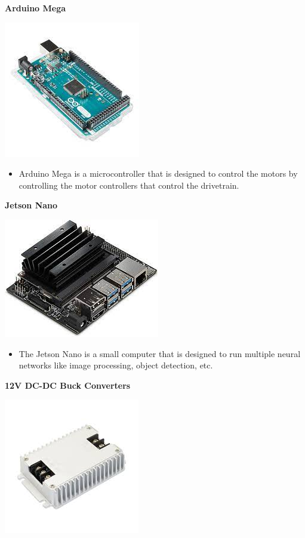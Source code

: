 \documentclass[a4paper, 10pt]{article}
\begin{document}
\textbf{Arduino Mega}

\includegraphics[scale=0.5]{Photos/Arduino Mega}

\begin{itemize}
\item
	Arduino Mega is a microcontroller that is designed to control the motors by controlling the motor controllers that control the drivetrain.
\end{itemize}


\textbf{Jetson Nano}

\includegraphics[scale=0.5]{Photos/Jetson Nano}

\begin{itemize}
\item
	The Jetson Nano is a small computer that is designed to run multiple neural networks like image processing, object detection, etc. 
\end{itemize}


\textbf{12V DC-DC Buck Converters}

\includegraphics[scale=0.5]{Photos/12V DC-DC buck converter}
\end{document}

